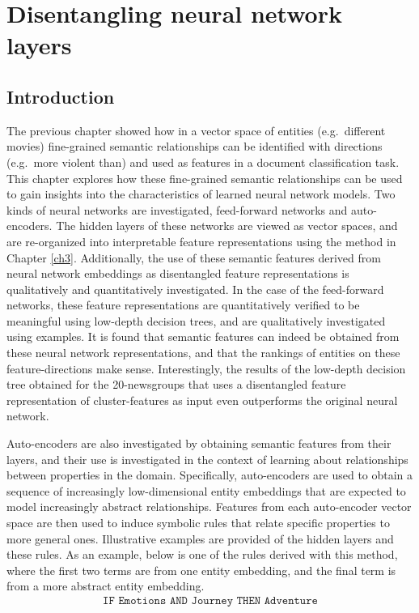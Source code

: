 \chapter{Disentangling neural network layers}\label{ch4}


\section{Introduction}

The previous chapter showed how in a vector space of entities (e.g.\ different movies) fine-grained semantic relationships can be identified with directions (e.g.\ more violent than) and used as features in a document classification task. This chapter explores how these fine-grained semantic relationships can be used to gain insights into the characteristics of learned neural network models. Two kinds of neural networks are investigated, feed-forward networks and auto-encoders. The hidden layers of these networks are viewed as vector spaces, and are re-organized into interpretable feature representations using the method in Chapter \ref{ch3}.  Additionally, the use of these semantic features derived from neural network embeddings as disentangled feature representations  is qualitatively and quantitatively investigated. In the case of the feed-forward networks, these feature representations are quantitatively verified to be meaningful using low-depth decision trees, and are qualitatively investigated using examples. It is found that semantic features can indeed be obtained from these neural network representations, and that the rankings of entities on these feature-directions make sense. Interestingly, the results of the low-depth decision tree obtained for the 20-newsgroups that uses a disentangled feature representation of cluster-features as input even  outperforms the original neural network.


Auto-encoders are also investigated by obtaining semantic features from their  layers, and their use is investigated in the context of learning about relationships between properties in the domain. Specifically, auto-encoders are used to obtain a sequence of increasingly low-dimensional entity embeddings that are expected to model increasingly abstract relationships. Features from each auto-encoder vector space are then used to induce symbolic rules that relate specific properties to more general ones. Illustrative examples are provided of the hidden layers and these rules. As an example, below is one of the rules derived with this method, where the first two terms are from one entity embedding, and the final term is from a more abstract entity embedding.
\begin{align}\label{rule1}\texttt{IF Emotions  AND  Journey THEN Adventure}\end{align} 

